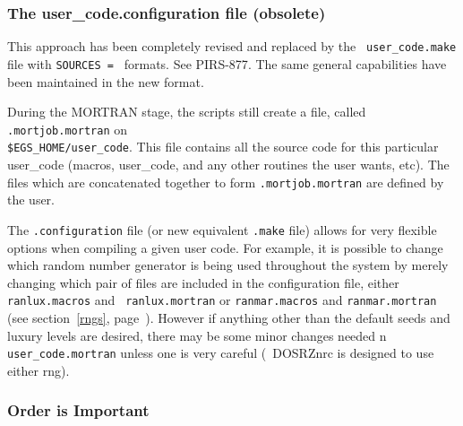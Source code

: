 \subsubsection{The  user\_code.configuration file (obsolete)}
This approach has been completely revised and replaced by the {\tt
user\_code.make} file with {\tt SOURCES = } formats. See
PIRS-877\cite{Ka03}.  The same general capabilities have been maintained
in the new format.

During the MORTRAN stage, the scripts still create a file, called
\verb+.mortjob.mortran+ on \\
\verb+$EGS_HOME/user_code+. This file
contains all the source code for this
particular user\_code (macros, user\_code, and 
any other routines the user wants, etc).
The files which are concatenated together to
form \verb+.mortjob.mortran+ are defined by the user.
% 
% 



The {\tt .configuration} file (or new equivalent {\tt .make} file) allows for 
very flexible options when compiling a given user
code.  For example, it is possible to change which random number generator
is being used throughout the system by merely changing which pair of files
are included in the configuration file, either {\tt ranlux.macros} and {\tt
ranlux.mortran} or {\tt ranmar.macros} and {\tt ranmar.mortran} (see
section~\ref{rngs}, page~\pageref{rngs}). However if
anything other than the default seeds and luxury levels are desired, there
may be some minor changes needed n {\tt user\_code.mortran} 
unless one is very careful (\eg\ DOSRZnrc is designed to use either rng). 
 

\subsubsection{Order is Important}

